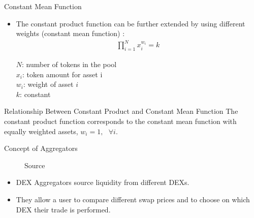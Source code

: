 \documentclass[handout]{beamer}
\begin{document}
\begin{frame}{Constant Mean Function}
\begin{itemize}
	\item The constant product function can be further extended by using different weights (constant mean function) \cite{BAL}:
		\begin{align*}
			\prod_{i=1}^N x_i^{w_i}= k
		\end{align*}

		$N$: number of tokens in the pool\\
		$x_i$: token amount for asset i\\
		$w_i$: weight of asset $i$\\
		$k$: constant
\end{itemize}

	\vspace{0.5cm}

	\begin{keytakeaway}{Relationship Between Constant Product and Constant Mean Function}
	The constant product function corresponds to the constant mean function with equally weighted assets, $w_i = 1, \text{ } \forall i$.
	\end{keytakeaway}

\end{frame}


\begin{frame}{Concept of Aggregators}
\begin{figure}
	\centering
	\resizebox{0.8\textwidth}{!}{
	\begin{tikzpicture}[scale=1.0, every node/.style={scale=1.0}]
			
	\end{tikzpicture}}
	\caption{Source \cite{FS:21}}
\end{figure}
	
\begin{itemize}
	\item DEX Aggregators source liquidity from different DEXs.
	\item They allow a user to compare different swap prices and to choose on which DEX their trade is performed.
\end{itemize}

\end{frame}
\end{document}
